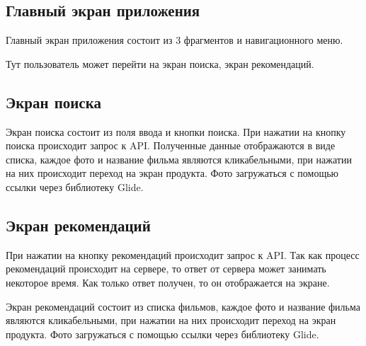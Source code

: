 \subsection{Главный экран приложения}

Главный экран приложения состоит из 3 фрагментов и навигационного меню.


Тут пользователь может перейти на экран поиска, экран рекомендаций.

\subsection{Экран поиска}

Экран поиска состоит из поля ввода и кнопки поиска.
При нажатии на кнопку поиска происходит запрос к API.
Полученные данные отображаются в виде списка, каждое фото и название фильма являются кликабельными, при нажатии на них
происходит переход на экран продукта.
Фото загружаться с помощью ссылки через библиотеку Glide.

\subsection{Экран рекомендаций}

При нажатии на кнопку рекомендаций происходит запрос к API.
Так как процесс рекомендаций происходит на сервере, то ответ от сервера может занимать некоторое время.
Как только ответ получен, то он отображается на экране.

Экран рекомендаций состоит из списка фильмов, каждое фото и название фильма являются кликабельными, при нажатии на них
происходит переход на экран продукта.
Фото загружаться с помощью ссылки через библиотеку Glide.